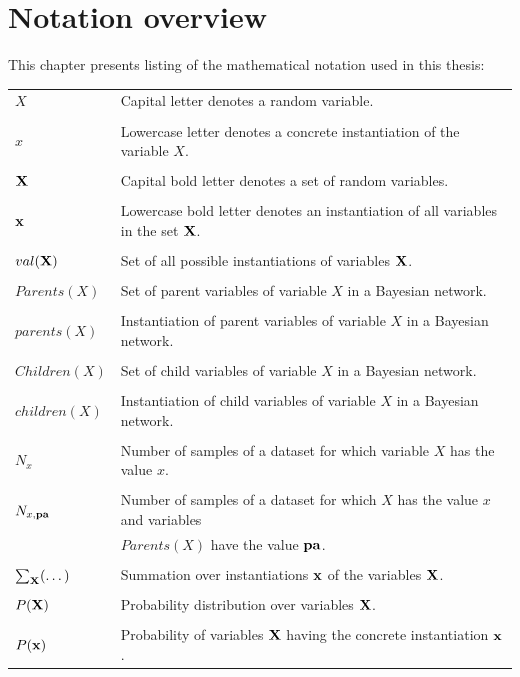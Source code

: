 \chapter{Notation overview}\label{ch:appendix_notation}
This chapter presents listing of the mathematical notation used in this thesis:

\bigskip
\begin{tabular}{ll}
	$X$ & Capital letter denotes a random variable.\\
	&\\
	$x$ & Lowercase letter denotes a concrete instantiation of the variable $X$.\\
	&\\
	${\bold{X}}$ & Capital bold letter denotes a set of random variables.\\
	&\\
	${\bold{x}}$ & Lowercase bold letter denotes an instantiation of all variables in the set ${\bold{X}}$.\\
	&\\
	$val({\bold{X}})$ & Set of all possible instantiations of variables ${\bold{X}}$.\\
	&\\
	$Parents(X)$ & Set of parent variables of variable $X$ in a Bayesian network.\\
	&\\
	$parents(X)$ & Instantiation of parent variables of variable $X$ in a Bayesian network.\\
	&\\
	$Children(X)$ & Set of child variables of variable $X$ in a Bayesian network.\\
	&\\
	$children(X)$ & Instantiation of child variables of variable $X$ in a Bayesian network.\\
	&\\
	$N_x$ & Number of samples of a dataset for which variable $X$ has the value $x$.\\
	&\\
	$N_{x,{\bold{pa}}}$ & Number of samples of a dataset for which $X$ has the value $x$ and variables\\
	                  & $Parents(X)$ have the value ${\bold{pa}}$.\\
	&\\
	$\sum_{\bold{X}} (\dots)$ & Summation over instantiations ${\bold{x}}$ of the variables ${\bold{X}}$.\\
	&\\
	$P({\bold{X}})$ & Probability distribution over variables ${\bold{X}}$.\\
	&\\
	$P({\bold{x}})$ & Probability of variables ${\bold{X}}$ having the concrete instantiation ${\bold{x}}$.\\
\end{tabular}










